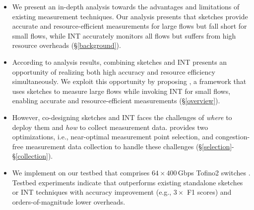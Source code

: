\begin{itemize}[leftmargin=*]
%
    \item We present an in-depth analysis towards the advantages and limitations of existing measurement techniques. Our analysis presents that sketches provide accurate and resource-efficient measurements for large flows but fall short for small flows, while INT accurately monitors all flows but suffers from high resource overheads (\S\ref{background}). 
%
    \item According to analysis results, combining sketches and INT presents an opportunity of realizing both high accuracy and resource efficiency simultaneously. We exploit this opportunity by proposing \sysname, a framework that uses sketches to measure large flows while invoking INT for small flows, enabling accurate and resource-efficient measurements (\S\ref{overview}). 
%
    \item However, co-designing sketches and INT faces the challenges of \emph{where} to deploy them and \emph{how} to collect measurement data. \sysname provides two optimizations, i.e., near-optimal measurement point selection, and congestion-free measurement data collection to handle these challenges (\S\ref{selection}-\S\ref{collection}). 
%
    \item We implement \sysname on our testbed that comprises $64\times 400$\,Gbps Tofino2 switches \cite{tofino2}. Testbed experiments indicate that \sysname outperforms existing standalone sketches or INT techniques with accuracy improvement (e.g., $3\times$ F1 scores) and orders-of-magnitude lower overheads. 
%
\end{itemize}

